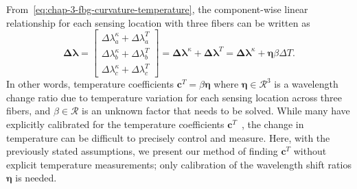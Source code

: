 From~\cref{eq:chap-3-fbg-curvature-temperature}, the component-wise linear relationship for each sensing location with three fibers can be written as
\begin{equation}
  \label{eq:chap-3-componentwise-wavelength}
  \mathbf{\Delta\boldsymbol\lambda} =
  \begin{bmatrix}
    \Delta\lambda_a^\kappa + \Delta\lambda_a^T \\
    \Delta\lambda_b^\kappa + \Delta\lambda_b^T \\
    \Delta\lambda_c^\kappa + \Delta\lambda_c^T
  \end{bmatrix}
   = \mathbf{\Delta\boldsymbol\lambda}^{\kappa} + \mathbf{\Delta\boldsymbol\lambda}^{T} = \mathbf{\Delta\boldsymbol\lambda}^{\kappa} + \boldsymbol\eta \beta \Delta T.
\end{equation}
In other words, temperature coefficients $\mathbf{c}^T = \beta\boldsymbol\eta$ where $\boldsymbol\eta\in \mathcal{R}^3$ is a wavelength change ratio due to temperature variation for each sensing location across three fibers, and $\beta\in\mathcal{R}$ is an unknown factor that needs to be solved. While many have explicitly calibrated for the temperature coefficients $\mathbf{c}^T$~\parencite{xuDiscriminationStrainTemperature1994,hillFiberBraggGrating1997,xiongInvestigationTemperatureCompensation2019}, the change in temperature can be difficult to precisely control and measure. Here, with the previously stated assumptions, we present our method of finding $\mathbf{c}^T$ without explicit temperature measurements; only calibration of the wavelength shift ratios $\boldsymbol\eta$ is needed.

